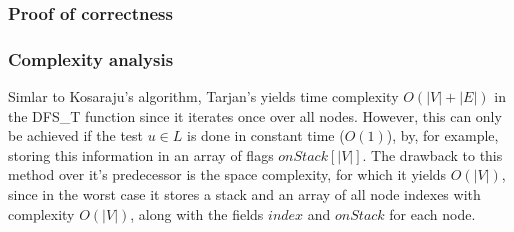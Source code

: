 \subsubsection{Proof of correctness}

\subsubsection{Complexity analysis}
Simlar to Kosaraju's algorithm, Tarjan's yields time complexity $O(|V|+|E|)$ in the DFS\_T function since it iterates once over all nodes. However, this can only be achieved if the test $u \in L$ is done in constant time ($O(1)$), by, for example, storing this information in an array of flags $onStack[|V|]$.
The drawback to this method over it's predecessor is the space complexity, for which it yields $O(|V|)$, since in the worst case it stores a stack and an array of all node indexes with complexity $O(|V|)$, along with the fields $index$ and $onStack$ for each node. 